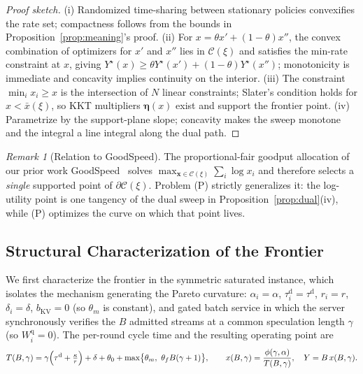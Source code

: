 \documentclass[11pt]{article}
\theoremstyle{definition}
\theoremstyle{remark}
\newtheorem{remark}{Remark}
\newcommand{\cC}{\mathcal{C}}
\newcommand{\bx}{\mathbf{x}}
\begin{document}
\begin{proof}[Proof sketch]
(i) Randomized time-sharing between stationary policies convexifies the rate
set; compactness follows from the bounds in
Proposition~\ref{prop:meaning}'s proof. (ii) For $x=\theta x'+(1-\theta)x''$,
the convex combination of optimizers for $x'$ and $x''$ lies in $\cC(\xi)$
and satisfies the min-rate constraint at $x$, giving
$Y^{\star}(x)\ge\theta Y^{\star}(x')+(1-\theta)Y^{\star}(x'')$; monotonicity
is immediate and concavity implies continuity on the interior. (iii) The
constraint $\min_i x_i\ge x$ is the intersection of $N$ linear constraints;
Slater's condition holds for $x<\bar{x}(\xi)$, so KKT multipliers
$\bm{\eta}(x)$ exist and support the frontier point. (iv) Parametrize by the
support-plane slope; concavity makes the sweep monotone and the integral a
line integral along the dual path.
\end{proof}

\begin{remark}[Relation to GoodSpeed]\label{rem:goodspeed}
The proportional-fair goodput allocation of our prior work
GoodSpeed~\cite{tran2026goodspeed} solves $\max_{\bx\in\cC(\xi)}\sum_i\log
x_i$ and therefore selects a \emph{single} supported point of
$\partial\cC(\xi)$. Problem (P) strictly generalizes it: the log-utility
point is one tangency of the dual sweep in
Proposition~\ref{prop:dual}(iv), while (P) optimizes the curve on which that
point lives.
\end{remark}

\subsection{Structural Characterization of the Frontier}\label{ssec:structure}

We first characterize the frontier in the symmetric saturated instance,
which isolates the mechanism generating the Pareto curvature: $\alpha_i=
\alpha$, $\tau_i^{\mathrm{d}}=\tau^{\mathrm{d}}$, $r_i=r$, $\delta_i=\delta$,
$b_{\mathrm{KV}}=0$ (so $\theta_m$ is constant), and gated batch service in
which the server synchronously verifies the $B$ admitted streams at a common
speculation length $\gamma$ (so $W_i^{\mathrm{q}}=0$). The per-round cycle
time and the resulting operating point are
\begin{equation}\label{eq:Tsym}
T(B,\gamma)=\gamma\Bigl(\tau^{\mathrm{d}}+\tfrac{\kappa}{r}\Bigr)
+\delta+\theta_0+\max\bigl\{\theta_m,\ \theta_f B(\gamma+1)\bigr\},
\qquad
x(B,\gamma)=\frac{\phi(\gamma,\alpha)}{T(B,\gamma)},
\quad
Y=B\,x(B,\gamma).
\end{equation}
\end{document}
